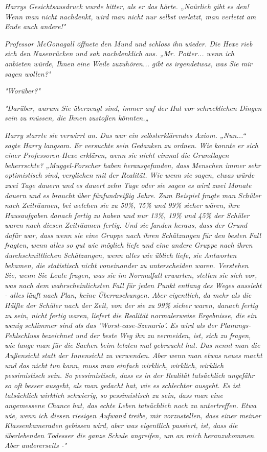 {\emph{Harrys Gesichtsausdruck wurde bitter, als er das hörte. „\emph{Naürlich}} \emph{gibt es den! Wenn man nicht nachdenkt, wird man nicht nur selbst verletzt, man verletzt am Ende auch andere!"}

\emph{Professor McGonagall öffnete den Mund und schloss ihn wieder. Die Hexe rieb sich den Nasenrücken und sah nachdenklich aus. „Mr. Potter... wenn ich anbieten würde, Ihnen eine Weile zuzuhören... gibt es irgendetwas, was Sie mir sagen wollen?"}

\emph{"Worüber?"}

\emph{"Darüber, warum Sie überzeugt sind, immer auf der Hut vor schrecklichen Dingen sein zu müssen, die Ihnen zustoßen könnten.„}

\emph{Harry starrte sie verwirrt an. Das war ein selbsterklärendes Axiom. „Nun...“ sagte Harry langsam. Er versuchte sein Gedanken zu ordnen. Wie} \emph{\emph{konnte}} \emph{er sich einer Professoren-Hexe erklären, wenn sie nicht einmal die Grundlagen beherrschte? „Muggel-Forscher haben herausgefunden, dass Menschen immer sehr optimistisch sind, verglichen mit der Realität. Wie wenn sie sagen, etwas würde zwei Tage dauern und es dauert zehn Tage oder sie sagen es wird zwei Monate dauern und es braucht über fünfundreißig Jahre. Zum Beispiel fragte man Schüler nach Zeiträumen, bei welchen sie zu 50\%, 75\% und 99\% sicher wären, ihre Hausaufgaben danach fertig zu haben und nur 13\%, 19\% und 45\% der Schüler waren nach diesen Zeiträumen fertig. Und sie fanden heraus, dass der Grund dafür war, dass wenn sie eine Gruppe nach ihren Schätzungen für den besten Fall fragten, wenn alles so gut wie möglich liefe und eine andere Gruppe nach ihren durchschnittlichen Schätzungen, wenn alles wie üblich liefe, sie Antworten bekamen, die statistisch nicht voneinander zu unterscheiden waren. Verstehen Sie, wenn Sie Leute fragen, was sie im} \emph{\emph{Normalfall}} \emph{erwarten, stellen sie sich vor, was nach dem wahrscheinlichsten Fall für jeden Punkt entlang des Weges aussieht - alles läuft nach Plan, keine Überraschungen. Aber eigentlich, da mehr als die Hälfte der Schüler nach der Zeit, von der sie zu 99\% sicher waren, danach fertig zu sein, nicht fertig waren, liefert die Realität normalerweise Ergebnisse, die ein wenig schlimmer sind als das 'Worst-case-Szenario'. Es wird als der Planungs-Fehlschluss bezeichnet und der beste Weg ihn zu vermeiden, ist, sich zu fragen, wie lange man für die Sachen beim letzten mal gebraucht hat. Das nennt man die Außensicht statt der Innensicht zu verwenden. Aber wenn man etwas neues macht und das nicht tun kann, muss man einfach wirklich, wirklich, wirklich pessimistisch sein. So pessimistisch, dass es in der Realität tatsächlich ungefähr so oft} \emph{\emph{besser}} \emph{ausgeht, als man gedacht hat, wie es schlechter ausgeht. Es ist tatsächlich} \emph{\emph{wirklich schwierig, so}} \emph{pessimistisch zu sein, dass man eine angemessene Chance hat, das echte Leben tatsächlich noch zu} \emph{\emph{untertreffen.}} \emph{Etwa wie, wenn ich diesen riesigen} \emph{Aufwand treibe, mir vorzustellen, dass einer meiner Klassenkameraden gebissen wird, aber was eigentlich passiert, ist, dass die überlebenden Todesser die ganze Schule angreifen, um an mich heranzukommen. Aber andererseits -"}

}
